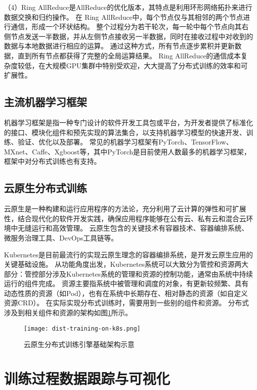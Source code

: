 （4）Ring AllReduce是AllReduce的优化版本，其特点是利用环形网络拓扑来进行数据交换和归约操作。
在 Ring AllReduce中，每个节点仅与其相邻的两个节点进行通信，形成一个环状结构。
整个过程分为若干轮次，每一轮中每个节点向其右侧节点发送一半数据，并从左侧节点接收另一半数据，同时在接收过程中对收到的数据与本地数据进行相应的运算。
通过这种方式，所有节点逐步累积并更新数据，直到所有节点都获得了完整的全局运算结果。
Ring AllReduce的通信成本复杂度较低，在大规模GPU集群中特别受欢迎，大大提高了分布式训练的效率和可扩展性。

\subsection{主流机器学习框架}

机器学习框架是指一种专门设计的软件开发工具包或平台，为开发者提供了标准化的接口、模块化组件和预先实现的算法集合，以支持机器学习模型的快速开发、训练、验证、优化以及部署。
常见的机器学习框架有PyTorch、TensorFlow、MXnet、Caffe、Xgboost等，其中PyTorch是目前使用人数最多的机器学习框架，框架中对分布式训练也有支持。

\subsection{云原生分布式训练}

云原生是一种构建和运行应用程序的方法论，充分利用了云计算的弹性和可扩展性，结合现代化的软件开发实践，确保应用程序能够在公有云、私有云和混合云环境中无缝运行和高效管理。
云原生包含的关键技术有容器技术、容器编排系统、微服务治理工具、DevOps工具链等。

Kubernetes是目前最流行的实现云原生理念的容器编排系统，是开发云原生应用的关键基础设施。
从功能角度出发，Kubernetes系统可以大致分为管控和资源两大部分：管控部分涉及Kubernetes系统的管理和资源的控制功能，通常由系统中持续运行的组件完成。
资源主要指系统中被管理和调度的对象，有更新较频繁、具有动态性质的资源（如Pod），也有在系统中长期存在、相对静态的资源（如自定义资源CRD）。
在实际实现分布式训练时，需要用到一些别的组件和资源。
分布式涉及到相关组件和资源的架构如图\ref{fig:disttrainingk8s}所示。

\begin{figure}
  \centering
  \texttt{[image: dist-training-on-k8s.png]}
  \caption{云原生分布式训练引擎基础架构示意}
  \label{fig:disttrainingk8s}
\end{figure}


\section{训练过程数据跟踪与可视化}

